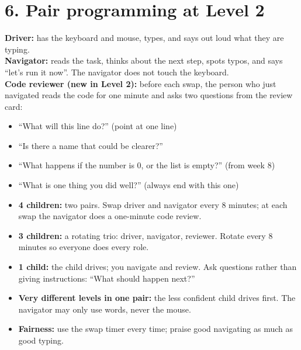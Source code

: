 \documentclass[level=2,teacher]{kidscode}
\begin{document}
\section{6. Pair programming at Level 2}
\begin{pairroles}
\textbf{Driver:} has the keyboard and mouse, types, and says out loud what they are typing.\\
\textbf{Navigator:} reads the task, thinks about the next step, spots typos, and says
\enquote{let's run it now}. The navigator does not touch the keyboard.\\
\textbf{Code reviewer (new in Level 2):} before each swap, the person who just navigated reads
the code for one minute and asks two questions from the review card:
\begin{itemize}[itemsep=0pt]
  \item \enquote{What will this line do?} (point at one line)
  \item \enquote{Is there a name that could be clearer?}
  \item \enquote{What happens if the number is 0, or the list is empty?} (from week 8)
  \item \enquote{What is one thing you did well?} (always end with this one)
\end{itemize}
\end{pairroles}

\begin{itemize}[itemsep=1pt]
  \item \textbf{4 children:} two pairs. Swap driver and navigator every 8 minutes; at each swap the
        navigator does a one-minute code review.
  \item \textbf{3 children:} a rotating trio: driver, navigator, reviewer. Rotate every 8 minutes so
        everyone does every role.
  \item \textbf{1 child:} the child drives; you navigate and review. Ask questions rather than giving
        instructions: \enquote{What should happen next?}
  \item \textbf{Very different levels in one pair:} the less confident child drives first. The
        navigator may only use words, never the mouse.
  \item \textbf{Fairness:} use the swap timer every time; praise good navigating as much as good typing.
\end{itemize}

\end{document}
